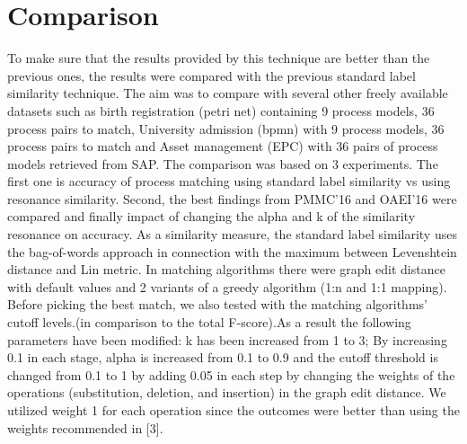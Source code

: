\documentclass[runningheads]{llncs}
\begin{document}
\section{Comparison}
To make sure that the results provided by this technique are better than the previous ones, the results were compared with the previous standard label similarity technique.  The aim was to compare with several other freely available datasets such as birth registration (petri net) containing 9 process models, 36 process pairs to match, University admission (bpmn) with 9 process models, 36 process pairs to match and Asset management (EPC) with 36 pairs of process models retrieved from SAP.
\newline\newline
The comparison was based on 3 experiments. The first one is accuracy of process matching using standard label similarity vs using resonance similarity. Second, the best findings from PMMC'16 and OAEI'16 were compared and finally impact of changing the alpha and k of the similarity resonance on accuracy. As a similarity measure, the standard label similarity uses the bag-of-words approach in connection with the maximum between Levenshtein distance and Lin metric. In matching algorithms there were graph edit distance with default values and 2 variants of a greedy algorithm (1:n and 1:1 mapping)\cite{ref14}. Before picking the best match, we also tested with the matching algorithms' cutoff levels.(in comparison to the total F-score).As a result the following parameters have been modified: k has been increased from 1 to 3;  By increasing 0.1 in each stage, alpha is increased from 0.1 to 0.9 and the cutoff threshold is changed from 0.1 to 1 by adding 0.05 in each step by changing the weights of the operations (substitution, deletion, and insertion) in the graph edit distance. We utilized weight 1 for each operation since the outcomes were better than using the weights recommended in [3].
\end{document}
